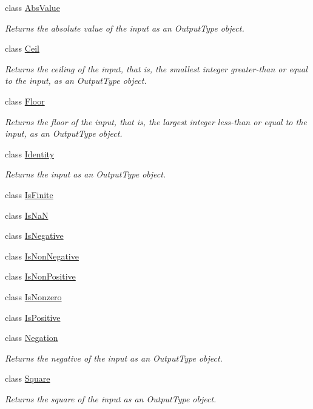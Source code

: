 \begin{DoxyCompactItemize}
\item 
class \hyperlink{classvct_unary_operations_1_1_abs_value}{Abs\-Value}
\begin{DoxyCompactList}\small\item\em Returns the absolute value of the input as an Output\-Type object. \end{DoxyCompactList}\item 
class \hyperlink{classvct_unary_operations_1_1_ceil}{Ceil}
\begin{DoxyCompactList}\small\item\em Returns the ceiling of the input, that is, the smallest integer greater-\/than or equal to the input, as an Output\-Type object. \end{DoxyCompactList}\item 
class \hyperlink{classvct_unary_operations_1_1_floor}{Floor}
\begin{DoxyCompactList}\small\item\em Returns the floor of the input, that is, the largest integer less-\/than or equal to the input, as an Output\-Type object. \end{DoxyCompactList}\item 
class \hyperlink{classvct_unary_operations_1_1_identity}{Identity}
\begin{DoxyCompactList}\small\item\em Returns the input as an Output\-Type object. \end{DoxyCompactList}\item 
class \hyperlink{classvct_unary_operations_1_1_is_finite}{Is\-Finite}
\item 
class \hyperlink{classvct_unary_operations_1_1_is_na_n}{Is\-Na\-N}
\item 
class \hyperlink{classvct_unary_operations_1_1_is_negative}{Is\-Negative}
\item 
class \hyperlink{classvct_unary_operations_1_1_is_non_negative}{Is\-Non\-Negative}
\item 
class \hyperlink{classvct_unary_operations_1_1_is_non_positive}{Is\-Non\-Positive}
\item 
class \hyperlink{classvct_unary_operations_1_1_is_nonzero}{Is\-Nonzero}
\item 
class \hyperlink{classvct_unary_operations_1_1_is_positive}{Is\-Positive}
\item 
class \hyperlink{classvct_unary_operations_1_1_negation}{Negation}
\begin{DoxyCompactList}\small\item\em Returns the negative of the input as an Output\-Type object. \end{DoxyCompactList}\item 
class \hyperlink{classvct_unary_operations_1_1_square}{Square}
\begin{DoxyCompactList}\small\item\em Returns the square of the input as an Output\-Type object. \end{DoxyCompactList}\end{DoxyCompactItemize}
